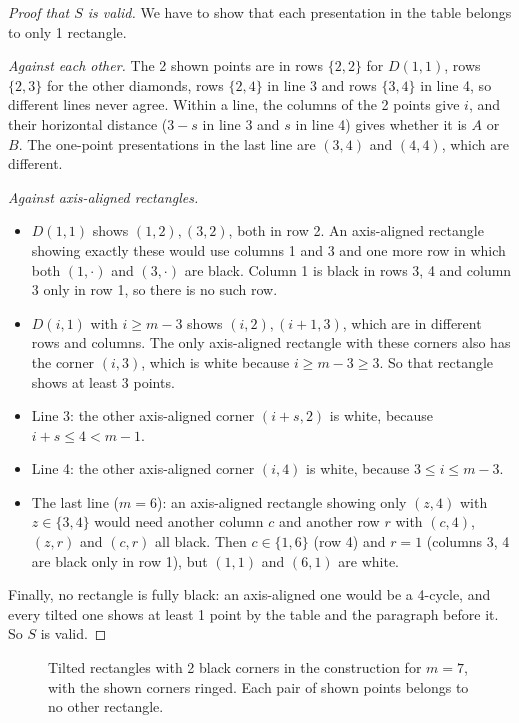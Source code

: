 \documentclass[11pt]{article}
\theoremstyle{definition}
\theoremstyle{remark}
\begin{document}
\begin{proof}[Proof that $S$ is valid]
We have to show that each presentation in the table belongs to only 1 rectangle.

\emph{Against each other.} The 2 shown points are in rows $\{2,2\}$ for $D(1,1)$, rows $\{2,3\}$
for the other diamonds, rows $\{2,4\}$ in line 3 and rows $\{3,4\}$ in line 4, so different
lines never agree. Within a line, the columns of the 2 points give $i$, and their horizontal
distance ($3-s$ in line 3 and $s$ in line 4) gives whether it is $A$ or $B$. The one-point
presentations in the last line are $(3,4)$ and $(4,4)$, which are different.

\emph{Against axis-aligned rectangles.}
\begin{itemize}[leftmargin=*,itemsep=1pt]
\item $D(1,1)$ shows $(1,2),(3,2)$, both in row 2. An axis-aligned rectangle showing exactly these
would use columns 1 and 3 and one more row in which both $(1,\cdot)$ and $(3,\cdot)$ are black.
Column 1 is black in rows 3, 4 and column 3 only in row 1, so there is no such row.
\item $D(i,1)$ with $i\ge m-3$ shows $(i,2),(i+1,3)$, which are in different rows and columns. The
only axis-aligned rectangle with these corners also has the corner $(i,3)$, which is white
because $i\ge m-3\ge3$. So that rectangle shows at least 3 points.
\item Line 3: the other axis-aligned corner $(i+s,2)$ is white, because $i+s\le4<m-1$.
\item Line 4: the other axis-aligned corner $(i,4)$ is white, because $3\le i\le m-3$.
\item The last line ($m=6$): an axis-aligned rectangle showing only $(z,4)$ with $z\in\{3,4\}$
would need another column $c$ and another row $r$ with $(c,4)$, $(z,r)$ and $(c,r)$ all black.
Then $c\in\{1,6\}$ (row 4) and $r=1$ (columns 3, 4 are black only in row 1), but $(1,1)$ and
$(6,1)$ are white.
\end{itemize}
Finally, no rectangle is fully black: an axis-aligned one would be a 4-cycle, and every tilted
one shows at least 1 point by the table and the paragraph before it. So $S$ is valid.
\end{proof}

\begin{figure}[htbp]
\centering

\caption{Tilted rectangles with 2 black corners in the construction for $m=7$, with the shown
corners ringed. Each pair of shown points belongs to no other rectangle.}
\label{fig:fourtilted}
\end{figure}
\end{document}
